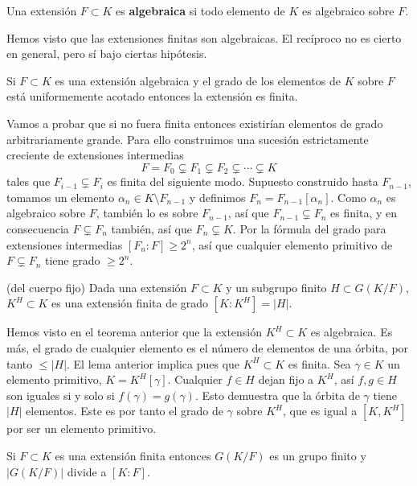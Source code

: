 Una extensión \(F\subset K\) es \textbf{algebraica} si todo elemento de
\(K\) es algebraico sobre \(F\). 

Hemos visto que las extensiones finitas son algebraicas. El recíproco no
es cierto en general, pero sí bajo ciertas hipótesis.


Si \(F\subset K\) es una extensión algebraica y el grado de los
elementos de \(K\) sobre \(F\) está uniformemente acotado entonces la
extensión es finita. 


Vamos a probar que si no fuera finita entonces existirían elementos de
grado arbitrariamente grande. Para ello construimos una sucesión
estrictamente creciente de extensiones intermedias
\[F=F_0\subsetneq F_1\subsetneq F_2\subsetneq\cdots\subsetneq K\]
tales que \(F_{i-1}\subsetneq F_i\) es finita del siguiente modo.
Supuesto construido hasta \(F_{n-1}\), tomamos un elemento
\(\alpha_n\in K\setminus F_{n-1}\) y definimos
\(F_n=F_{n-1}[\alpha_n]\). Como \(\alpha_n\) es algebraico sobre
\(F\), también lo es sobre \(F_{n-1}\), así que
\(F_{n-1}\subsetneq F_n\) es finita, y en consecuencia
\(F\subsetneq F_n\) también, así que \(F_n\subsetneq K\). Por la
fórmula del grado para extensiones intermedias \([F_n:F]\geq 2^n\), así
que cualquier elemento primitivo de \(F\subsetneq F_n\) tiene grado
\(\geq 2^n\). 

\textrm{\normalfont (del cuerpo fijo)} Dada una extensión
\(F\subset K\) y un subgrupo finito \(H\subset G(K/F)\),
\(K^H\subset K\) es una extensión finita de grado \([K:K^H]=|H|\).


Hemos visto en el teorema anterior que la extensión \(K^H\subset K\) es
algebraica. Es más, el grado de cualquier elemento es el número de
elementos de una órbita, por tanto \(\leq |H|\). El lema anterior
implica pues que \(K^H\subset K\) es finita. Sea \(\gamma\in K\) un
elemento primitivo, \(K=K^H[\gamma]\). Cualquier \(f\in H\) dejan fijo a
\(K^H\), así \(f,g\in H\) son iguales si y solo si
\(f(\gamma)=g(\gamma)\). Esto demuestra que la órbita de \(\gamma\)
tiene \(|H|\) elementos. Este es por tanto el grado de \(\gamma\) sobre
\(K^H\), que es igual a \([K,K^H]\) por ser un elemento primitivo.


Si \(F\subset K\) es una extensión finita entonces \(G(K/F)\) es un
grupo finito y \(|G(K/F)|\) divide a \([K:F]\). 

